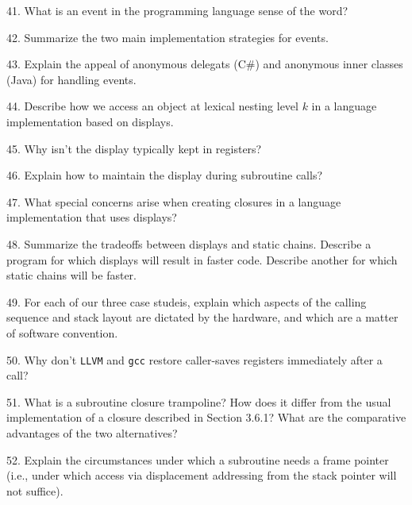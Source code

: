 41. What is an event in the programming language sense of the word?

\filbreak
\vskip 1cm

42. Summarize the two main implementation strategies for events.

\filbreak
\vskip 1cm

43. Explain the appeal of anonymous delegats (C$\#$) and anonymous inner classes (Java) for handling events.

\filbreak
\vskip 1cm

44. Describe how we access an object at lexical nesting level $k$ in a language implementation based on displays.

\filbreak
\vskip 1cm

45. Why isn't the display typically kept in registers?

\filbreak
\vskip 1cm

46. Explain how to maintain the display during subroutine calls?
\filbreak
\vskip 1cm

47. What special concerns arise when creating closures in a language implementation that uses displays?

\filbreak
\vskip 1cm

48. Summarize the tradeoffs between displays and static chains. Describe a program for which displays will result in faster code. Describe another for which static chains will be faster.

\filbreak
\vskip 1cm

49. For each of our three case studeis, explain which aspects of the calling sequence and stack layout are dictated by the hardware, and which are a matter of software convention.

\filbreak
\vskip 1cm

50. Why don't {\tt LLVM} and {\tt gcc} restore caller-saves registers immediately after a call?

\filbreak
\vskip 1cm

51. What is a subroutine closure trampoline? How does it differ from the usual implementation of a closure described in Section 3.6.1? What are the comparative advantages of the two alternatives?

\filbreak
\vskip 1cm

52. Explain the circumstances under which a subroutine needs a frame pointer (i.e., under which access via displacement addressing from the stack pointer will not suffice).

\filbreak
\vskip 1cm

